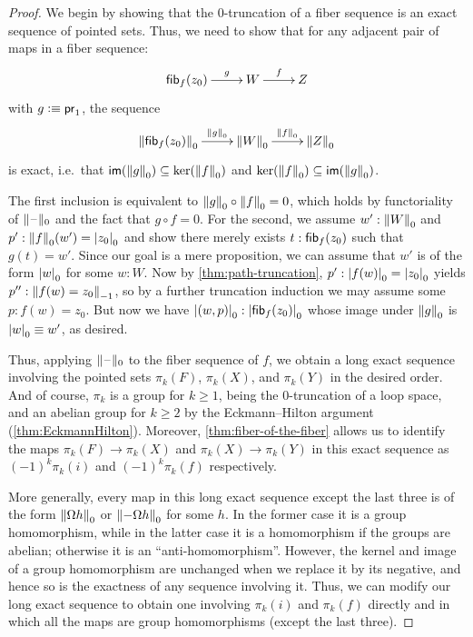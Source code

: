 \begin{proof}
  We begin by showing that the 0-truncation of a fiber sequence is an exact sequence of pointed sets.
  Thus, we need to show that for any adjacent pair of maps in a fiber sequence:
  \[\xymatrix{\hfib{f}{z_0} \ar^-g[r] & W \ar^-f[r] & Z}\]
  with $g\defeq \proj1$, the sequence
  \[\xymatrix{\trunc{0}{\hfib{f}{z_0}} \ar^-{\trunc0g}[r] & \trunc0{W}
    \ar^-{\trunc0{f}}[r] & \trunc0{Z}}\]
  is exact, i.e.\ that $\im(\trunc0g)\subseteq\ker(\trunc0f)$ and $\ker(\trunc0f)\subseteq\im(\trunc0g)$.

  The first inclusion is equivalent to $\trunc0g\circ\trunc0f=0$, which holds by functoriality of $\truncf0$ and the fact that $g\circ f=0$.
  For the second, we assume $w':\trunc0W$ and $p':\trunc0f(w')=\tproj0{z_0}$ and show there merely exists ${t:\hfib{f}{z_0}}$ such that $g(t)=w'$.
  Since our goal is a mere proposition, we can assume that $w'$ is of the
  form $\tproj0w$ for some $w:W$.
  Now by \cref{thm:path-truncation}, $p' : \tproj0{f(w)}=\tproj0{z_0}$ yields $p'': \trunc{-1}{f(w)=z_0}$, so by a further truncation induction we may assume some $p:f(w)=z_0$.
  But now we have $\tproj0{(w,p)}:\tproj0{\hfib{f}{z_0}}$ whose image under $\trunc0g$ is $\tproj0w\jdeq w'$, as desired.

  Thus, applying $\truncf0$ to the fiber sequence of $f$, we obtain a long exact sequence involving the pointed sets $\pi_k(F)$, $\pi_k(X)$, and $\pi_k(Y)$ in the desired order.
  And of course, $\pi_k$ is a group for $k\ge1$, being the 0-truncation of a loop space, and an abelian group for $k\ge 2$ by the Eckmann--Hilton argument
   (\cref{thm:EckmannHilton}).
  Moreover, \cref{thm:fiber-of-the-fiber} allows us to identify the maps $\pi_k(F) \to \pi_k(X)$ and $\pi_k(X) \to \pi_k(Y)$ in this exact sequence as $(-1)^k \pi_k(i)$ and $(-1)^k \pi_k(f)$ respectively.

  More generally, every map in this long exact sequence except the last three is of the form $\trunc0{\Omega h}$ or $\trunc0{-\Omega h}$ for some $h$.
  In the former case it is a group homomorphism, while in the latter case it is a homomorphism if the groups are abelian; otherwise it is an ``anti-homomorphism''.
  However, the kernel and image of a group homomorphism are unchanged when we replace it by its negative, and hence so is the exactness of any sequence involving it.
  Thus, we can modify our long exact sequence to obtain one involving $\pi_k(i)$ and $\pi_k(f)$ directly and in which all the maps are group homomorphisms (except the last three).
\end{proof}

